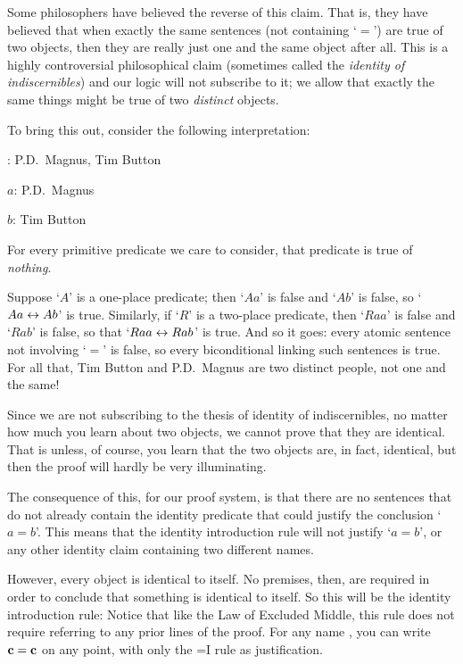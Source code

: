 Some philosophers have believed the reverse of this claim. That is, they have believed that when exactly the same sentences (not containing `$=$') are true of two objects, then they are really just one and the same object after all. This is a highly controversial philosophical claim (sometimes called the \emph{identity of indiscernibles}) and our logic will not subscribe to it; we allow that exactly the same things might be true of two \emph{distinct} objects.  

To bring this out, consider the following interpretation:
	\begin{ebullet}
		\item[\text{domain}:] P.D.\ Magnus, Tim Button
		\item[$a$:] P.D.\ Magnus
		\item[$b$:] Tim Button
		\item For every primitive predicate we care to consider, that predicate is true of \emph{nothing}.
	\end{ebullet}
Suppose `$A$' is a one-place predicate; then `$Aa$' is false and `$Ab$' is false, so `$Aa \leftrightarrow Ab$' is true. Similarly, if `$R$' is a two-place predicate, then `$Raa$' is false and `$Rab$' is false, so that `$Raa \leftrightarrow Rab$' is true. And so it goes: every atomic sentence not involving `$=$' is false, so every biconditional linking such sentences is true. For all that, Tim Button and P.D.\ Magnus are two distinct people, not one and the same!

Since we are not subscribing to the thesis of identity of indiscernibles, no matter how much you learn about two objects, we cannot prove that they are identical. That is unless, of course, you learn that the two objects are, in fact, identical, but then the proof will hardly be very illuminating.

The consequence of this, for our proof system, is that there are no sentences that do not already contain the identity predicate that could justify the conclusion `$a=b$'. This means that the identity introduction rule will not justify `$a=b$', or any other identity claim containing two different names.

However, every object is identical to itself. No premises, then, are required in order to conclude that something is identical to itself. So this will be the identity introduction rule:
Notice that like the Law of Excluded Middle, this rule does not require referring to any prior lines of the proof. For any name , you can write $\mathbf{c}=\mathbf{c}$ on any point, with only the {=}I rule as justification. 


